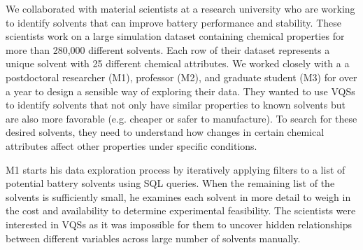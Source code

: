 \par\noindent{} We collaborated with material scientists at a research university who are working to identify solvents that can improve battery performance and stability. These scientists work on a large simulation dataset containing chemical properties for more than 280,000 different solvents. Each row of their dataset represents a unique solvent with 25 different chemical attributes. We worked closely with a a postdoctoral researcher (M1), professor (M2), and graduate student (M3) for over a year to design a sensible way of exploring their data. They wanted to use VQSs to identify solvents that not only have similar properties to known solvents but are also more favorable (e.g. cheaper or safer to manufacture). To search for these desired solvents, they need to understand how changes in certain chemical attributes affect other properties under specific conditions.
\par M1 starts his data exploration process by iteratively applying filters to a list of potential battery solvents using SQL queries. When the remaining list of the solvents is sufficiently small, he examines each solvent in more detail to weigh in the cost and availability to determine experimental feasibility. The scientists were interested in VQSs as it was impossible for them to uncover hidden relationships between different variables across large number of solvents manually.%